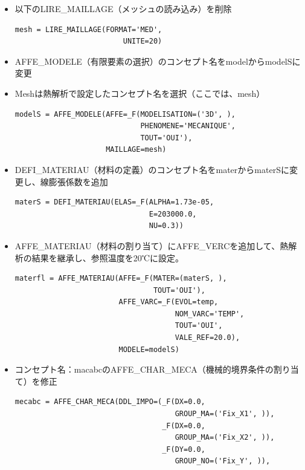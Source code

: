 \begin{itemize}
	\item 以下のLIRE\_MAILLAGE（メッシュの読み込み）を削除
	      \begin{lstlisting}[caption =メッシュの読み込み,label=LIRE_MAILLAGE]
    mesh = LIRE_MAILLAGE(FORMAT='MED',
                         UNITE=20)
    \end{lstlisting}
	\item AFFE\_MODELE（有限要素の選択）のコンセプト名をmodelからmodelSに変更
	\item Meshは熱解析で設定したコンセプト名を選択（ここでは、mesh）
	      \begin{lstlisting}[caption =有限要素の選択,label=AFFE_MODELE]
modelS = AFFE_MODELE(AFFE=_F(MODELISATION=('3D', ),
                             PHENOMENE='MECANIQUE',
                             TOUT='OUI'),
                     MAILLAGE=mesh)
    \end{lstlisting}
	\item DEFI\_MATERIAU（材料の定義）のコンセプト名をmaterからmaterSに変更し、線膨張係数を追加
	      \begin{lstlisting}[caption =材料の定義,label=DEFI_MATERIAU]
materS = DEFI_MATERIAU(ELAS=_F(ALPHA=1.73e-05,
                               E=203000.0,
                               NU=0.3))
    \end{lstlisting}
	\item AFFE\_MATERIAU（材料の割り当て）にAFFE\_VERCを追加して、熱解析の結果を継承し、参照温度を20℃に設定。
	      \begin{lstlisting}[caption =材料の割当,label=AFFE_MATERIAU]
materfl = AFFE_MATERIAU(AFFE=_F(MATER=(materS, ),
                                TOUT='OUI'),
                        AFFE_VARC=_F(EVOL=temp,
                                     NOM_VARC='TEMP',
                                     TOUT='OUI',
                                     VALE_REF=20.0),
                        MODELE=modelS)
    \end{lstlisting}
	\item コンセプト名：macabcのAFFE\_CHAR\_MECA（機械的境界条件の割り当て）を修正
	      \begin{lstlisting}[caption =機械的境界条件の割り当て,label=mecabc]
mecabc = AFFE_CHAR_MECA(DDL_IMPO=(_F(DX=0.0,
                                     GROUP_MA=('Fix_X1', )),
                                  _F(DX=0.0,
                                     GROUP_MA=('Fix_X2', )),
                                  _F(DY=0.0,
                                     GROUP_NO=('Fix_Y', )),

\end{lstlisting}
\end{itemize}
